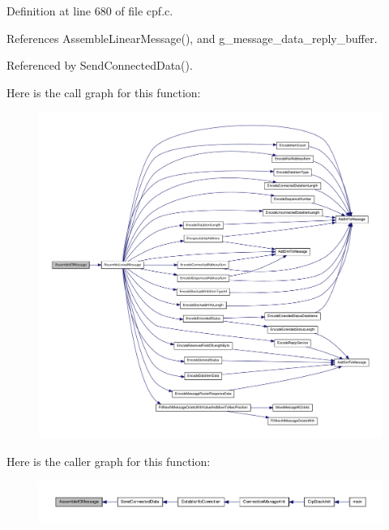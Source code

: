 \-Definition at line 680 of file cpf.\-c.



\-References \-Assemble\-Linear\-Message(), and g\-\_\-message\-\_\-data\-\_\-reply\-\_\-buffer.



\-Referenced by \-Send\-Connected\-Data().



\-Here is the call graph for this function\-:
\nopagebreak
\begin{figure}[H]
\begin{center}
\leavevmode
\includegraphics[width=350pt]{d4/d91/group__ENCAP_gad61fa4f84989cf27086d57557ad552c4_cgraph}
\end{center}
\end{figure}




\-Here is the caller graph for this function\-:
\nopagebreak
\begin{figure}[H]
\begin{center}
\leavevmode
\includegraphics[width=350pt]{d4/d91/group__ENCAP_gad61fa4f84989cf27086d57557ad552c4_icgraph}
\end{center}
\end{figure}


